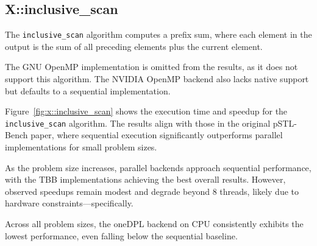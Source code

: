 \documentclass[sigconf]{acmart}
\begin{document}
\subsection{X::inclusive\_scan}

The \texttt{inclusive\_scan} algorithm computes a prefix sum, where each
element in the output is the sum of all preceding elements plus the current
element.

The GNU OpenMP implementation is omitted from the results, as it does not
support this algorithm. The NVIDIA OpenMP backend also lacks native support but
defaults to a sequential implementation.

Figure~\ref{fig:x::inclusive_scan} shows the execution time and speedup for the
\texttt{inclusive\_scan} algorithm. The results align with those in the
original pSTL-Bench paper, where sequential execution significantly outperforms
parallel implementations for small problem sizes.

As the problem size increases, parallel backends approach sequential
performance, with the TBB implementations achieving the best overall results.
However, observed speedups remain modest and degrade beyond 8 threads, likely
due to hardware constraints—specifically.

Across all problem sizes, the oneDPL backend on CPU consistently exhibits the
lowest performance, even falling below the sequential baseline.
\end{document}
